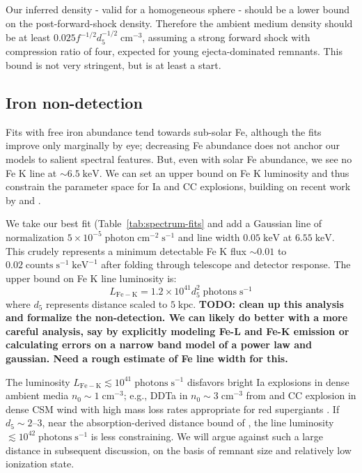 \documentclass[twocolumn,tighten,trackchanges]{aastex61}
\newcommand*{\mt}{\mathrm}
\newcommand*{\unit}[1]{\;\mt{#1}}  %
\newcommand*{\abt}{\mathord{\sim}} %
\begin{document}
Our inferred density - valid for a homogeneous sphere - should be a lower bound
on the post-forward-shock density.
Therefore the ambient medium density should be at least
$0.025 f^{-1/2} d_{5}^{-1/2} \unit{cm^{-3}}$, assuming a strong forward shock
with compression ratio of four, expected for young ejecta-dominated remnants.
This bound is not very stringent, but is at least a start.

\subsection{Iron non-detection}

Fits with free iron abundance tend towards sub-solar Fe, although the fits
improve only marginally by eye; decreasing Fe abundance does not anchor our
models to salient spectral features.
But, even with solar Fe abundance, we see no Fe K line at $\abt 6.5 \unit{keV}$.
We can set an upper bound on Fe K luminosity and thus constrain the parameter
space for Ia and CC explosions, building on recent work by
\citet{yamaguchi2014-iron} and \citet{patnaude2015}.

We take our best fit (Table~\ref{tab:spectrum-fits} and add a Gaussian line of
normalization $5 \times 10^{-5} \unit{photon\;cm^{-2}\;s^{-1}}$ and
line width $0.05 \unit{keV}$ at $6.55 \unit{keV}$.
This crudely represents a minimum detectable Fe K flux
$\abt 0.01$ to $0.02 \unit{counts\;s^{-1}\;keV^{-1}}$ after folding through
telescope and detector response.
The upper bound on Fe K line luminosity is:
\[
    L_{\mt{Fe-K}} = 1.2 \times 10^{41} d_5^2 \unit{photons\;s^{-1}}
\]
where $d_5$ represents distance scaled to $5 \unit{kpc}$.
\textbf{TODO: clean up this analysis and formalize the non-detection.
We can likely do better with a more careful analysis, say by explicitly
modeling Fe-L and Fe-K emission or calculating errors on a narrow band model of
a power law and gaussian.  Need a rough estimate of Fe line width for this.}

The luminosity $L_{\mt{Fe-K}} \lesssim 10^{41} \unit{photons\;s^{-1}}$
disfavors bright Ia explosions in dense ambient media
$n_0 \sim 1 \unit{cm^{-3}}$; e.g., DDTa in $n_0 \sim 3 \unit{cm^{-3}}$ from
\citet{badenes2003, badenes2005, badenes2006} \citep{yamaguchi2014-iron}
and CC explosion in dense CSM wind with high mass loss rates appropriate for
red supergiants \citep{patnaude2015}.
If $d_5 \sim 2$--$3$, near the  absorption-derived distance bound of
\citet{gaensler1998-g309}, the line luminosity
$\lesssim 10^{42} \unit{photons\;s^{-1}}$ is less constraining.
We will argue against such a large distance in subsequent discussion, on
the basis of remnant size and relatively low ionization state.
\end{document}
